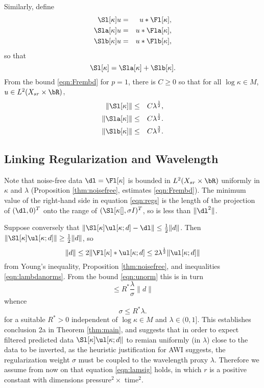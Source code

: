 Similarly, define
\begin{eqnarray}
  \label{eqn:sdeflam}
  \Sl[\kappa]u &=& u *\Fl[\kappa],  \nonumber \\
  \Sla[\kappa]u &=& u *\Fla[\kappa], \nonumber\\
  \Slb[\kappa]u &=& u *\Flb[\kappa], 
\end{eqnarray}
so that
\[
  \Sl[\kappa] = \Sla[\kappa] + \Slb[\kappa].
\]
From the bound \ref{eqn:Frembd} for $p=1$, there is $C \ge 0$ so that
for all $\log \kappa \in M$, $u \in L^2(X_{sr} \times \bR)$,
\begin{eqnarray}
  \label{eqn:Srembd}
  \|\Sl[\kappa]\| &\le&  C\lambda^{\frac{1}{2}},\nonumber \\
  \|\Sla[\kappa]\|& \le& C\lambda^{\frac{1}{2}}. \nonumber \\
  \|\Slb[\kappa]\| & \le& C\lambda^{\frac{3}{2}}.
\end{eqnarray}

\subsection{Linking Regularization and Wavelength}
Note that noise-free data $\dl = \Fl[\kappa]$ is bounded in $L^2(X_{sr}
\times \bR)$ uniformly in $\kappa$ and $\lambda$  (Proposition
\ref{thm:noisefree}, estimates \ref{eqn:Frembd}). 
The minimum value of the right-hand side in equation \ref{eqn:regs} is
the length of the projection of $(\dl,0)^T$ onto the range of
$(\Sl[\kappa[],\sigma I)^T$, so is less than $\|\dl^2\|$.

Suppose conversely that $\|\Sl[\kappa]\ul[\kappa;d] - \dl\| \le
\frac{1}{2}\|d\|$. Then $\|\Sl[\kappa]\ul[\kappa;d] \| \ge
\frac{1}{2}\|d\|$, so
\[
  \|d\| \le 2\|\Fl[\kappa]*\ul[\kappa;d] \le
  2\lambda^{\frac{1}{2}}\|\ul[\kappa;d]\|
\]
from Young's inequality, Proposition \ref{thm:noisefree}, and
inequalities \ref{eqn:lambdanorms}. From the bound \ref{eqn:unorm} this is in
turn
\[
  \le R^* \frac{\lambda}{\sigma} \|d\|
\]
whence
\[
  \sigma \le R^* \lambda.
\]
for a suitable $R^*>0$ independent of $\log \kappa \in M$ and $\lambda
\in (0,1]$. This establishes conclusion 2a in Theorem \ref{thm:main}, and
suggests that in order to expect filtered predicted data
$\Sl[\kappa]\ul[\kappa;d\|$ to remian uniformly (in $\lambda$) close to the data to be
inverted, as the heuristic justification for AWI suggests, the
regularization weight $\sigma$ must be coupled to the wavelength proxy
$\lambda$. Therefore we assume from now on that equation
\ref{eqn:lamsig} holds,  
in which $r$ is a positive constant with dimensions pressure$^2 \times 
$ time$^2$.

